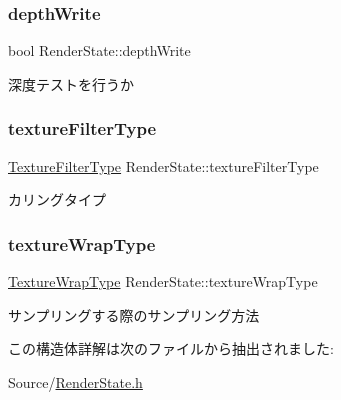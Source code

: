 \subsubsection{\texorpdfstring{depth\+Write}{depthWrite}}
{\footnotesize\ttfamily bool Render\+State\+::depth\+Write}



深度テストを行うか 

\mbox{\label{struct_render_state_a22610d4664d4b8bc5481a75d782d5aef}} 
\subsubsection{\texorpdfstring{texture\+Filter\+Type}{textureFilterType}}
{\footnotesize\ttfamily \mbox{\hyperlink{_render_state_8h_a21d270ce58807e6b815650a47f4beba3}{Texture\+Filter\+Type}} Render\+State\+::texture\+Filter\+Type}



カリングタイプ 

\mbox{\label{struct_render_state_a05e12034f4c324a83aa53d0da9be5ed3}} 
\subsubsection{\texorpdfstring{texture\+Wrap\+Type}{textureWrapType}}
{\footnotesize\ttfamily \mbox{\hyperlink{_render_state_8h_a7da0419d34309c6fd35bd55dcc01de2b}{Texture\+Wrap\+Type}} Render\+State\+::texture\+Wrap\+Type}



サンプリングする際のサンプリング方法 



この構造体詳解は次のファイルから抽出されました\+:\begin{DoxyCompactItemize}
\item 
Source/\mbox{\hyperlink{_render_state_8h}{Render\+State.\+h}}\end{DoxyCompactItemize}
